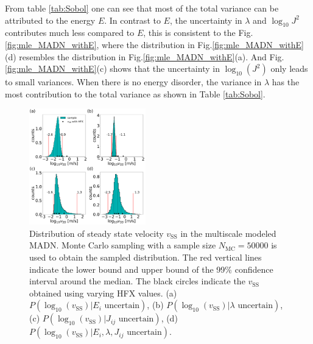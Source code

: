 \documentclass[%
 reprint,
 amsmath,amssymb,
 aps,
]{revtex4-2}
\begin{document}
From table \ref{tab:Sobol} one can see that most of the total variance can be attributed to the energy $E$. In contrast to $E$, the uncertainty in $\lambda$ and $\log_{10} J^2$ contributes much less compared to $E$, this is consistent to the Fig.\ref{fig:mle_MADN_withE}, where the distribution in Fig.\ref{fig:mle_MADN_withE}(d) resembles the distribution in Fig.\ref{fig:mle_MADN_withE}(a).
And Fig.\ref{fig:mle_MADN_withE}(c) shows that the uncertainty in $\log_{10}(J^2)$ only leads to small variances.
When there is no energy disorder, the variance in $\lambda$ has the most contribution to the total variance as shown in Table \ref{tab:Sobol}.

%
\begin{figure}
  \centering
  \includegraphics[width=0.45\textwidth]{figs/fig_mle_MADN_withE_SS.pdf}
  \caption{Distribution of steady state velocity $v_\text{SS}$ in the multiscale modeled MADN.
  Monte Carlo sampling with a sample size $N_\text{MC}=50000$ is used to obtain the sampled distribution.
  The red vertical lines indicate the lower bound and upper bound of the 99\% confidence interval around the median.
  The black circles indicate the $v_\text{SS}$ obtained using varying HFX values.
  (a) $P(\log_{10}(v_\text{SS})|E_i \text{ uncertain})$, 
  (b) $P(\log_{10}(v_\text{SS})|\lambda \text{ uncertain})$, 
  (c) $P(\log_{10}(v_\text{SS})|J_{ij} \text{ uncertain})$, 
  (d) $P(\log_{10}(v_\text{SS})|E_i, \lambda, J_{ij} \text{ uncertain})$. }
  \label{fig:mle_MADN_withE_SS}
\end{figure}
%
%
\end{document}

